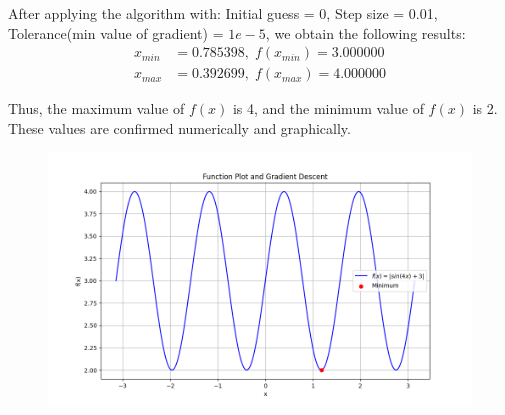 \documentclass[journal]{IEEEtran}
\begin{document}
After applying the algorithm with:
Initial guess = 0, Step size = 0.01, Tolerance(min value of gradient) = \(1e-5\), we obtain the following results:\\
\begin{align}
    x_{min} &= 0.785398, \; f(x_{min}) = 3.000000\\
    x_{max} &= 0.392699, \; f(x_{max}) = 4.000000
\end{align}

Thus, the maximum value of \(f(x)\) is 4, and the minimum value of \(f(x)\) is 2. These values are confirmed numerically and graphically.\\

\begin{figure}[h!]
   \centering
   \includegraphics[width=0.7\columnwidth]{figs/fig.png}
\end{figure}
\end{document}
